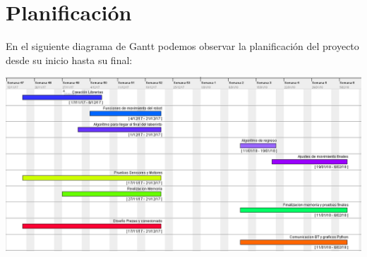 \chapter{Planificación}
En el siguiente diagrama de Gantt podemos observar la planificación del proyecto desde su inicio hasta su final:
\begin{center}
	\includegraphics[scale=0.55]{Gant.png}
\end{center}
